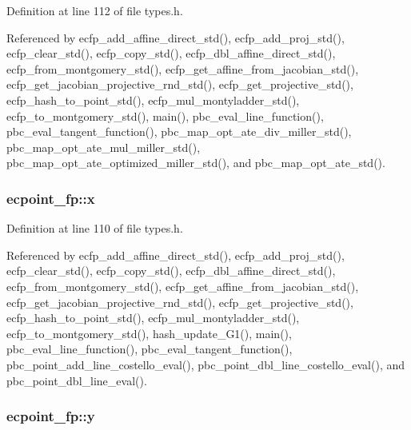 Definition at line 112 of file types.\-h.



Referenced by ecfp\-\_\-add\-\_\-affine\-\_\-direct\-\_\-std(), ecfp\-\_\-add\-\_\-proj\-\_\-std(), ecfp\-\_\-clear\-\_\-std(), ecfp\-\_\-copy\-\_\-std(), ecfp\-\_\-dbl\-\_\-affine\-\_\-direct\-\_\-std(), ecfp\-\_\-from\-\_\-montgomery\-\_\-std(), ecfp\-\_\-get\-\_\-affine\-\_\-from\-\_\-jacobian\-\_\-std(), ecfp\-\_\-get\-\_\-jacobian\-\_\-projective\-\_\-rnd\-\_\-std(), ecfp\-\_\-get\-\_\-projective\-\_\-std(), ecfp\-\_\-hash\-\_\-to\-\_\-point\-\_\-std(), ecfp\-\_\-mul\-\_\-montyladder\-\_\-std(), ecfp\-\_\-to\-\_\-montgomery\-\_\-std(), main(), pbc\-\_\-eval\-\_\-line\-\_\-function(), pbc\-\_\-eval\-\_\-tangent\-\_\-function(), pbc\-\_\-map\-\_\-opt\-\_\-ate\-\_\-div\-\_\-miller\-\_\-std(), pbc\-\_\-map\-\_\-opt\-\_\-ate\-\_\-mul\-\_\-miller\-\_\-std(), pbc\-\_\-map\-\_\-opt\-\_\-ate\-\_\-optimized\-\_\-miller\-\_\-std(), and pbc\-\_\-map\-\_\-opt\-\_\-ate\-\_\-std().

\hypertarget{structecpoint__fp_a5d560562bc26a70f40189ad902070f28}{
\subsubsection[{x}]{ ecpoint\-\_\-fp\-::x}}\label{structecpoint__fp_a5d560562bc26a70f40189ad902070f28}


Definition at line 110 of file types.\-h.



Referenced by ecfp\-\_\-add\-\_\-affine\-\_\-direct\-\_\-std(), ecfp\-\_\-add\-\_\-proj\-\_\-std(), ecfp\-\_\-clear\-\_\-std(), ecfp\-\_\-copy\-\_\-std(), ecfp\-\_\-dbl\-\_\-affine\-\_\-direct\-\_\-std(), ecfp\-\_\-from\-\_\-montgomery\-\_\-std(), ecfp\-\_\-get\-\_\-affine\-\_\-from\-\_\-jacobian\-\_\-std(), ecfp\-\_\-get\-\_\-jacobian\-\_\-projective\-\_\-rnd\-\_\-std(), ecfp\-\_\-get\-\_\-projective\-\_\-std(), ecfp\-\_\-hash\-\_\-to\-\_\-point\-\_\-std(), ecfp\-\_\-mul\-\_\-montyladder\-\_\-std(), ecfp\-\_\-to\-\_\-montgomery\-\_\-std(), hash\-\_\-update\-\_\-\-G1(), main(), pbc\-\_\-eval\-\_\-line\-\_\-function(), pbc\-\_\-eval\-\_\-tangent\-\_\-function(), pbc\-\_\-point\-\_\-add\-\_\-line\-\_\-costello\-\_\-eval(), pbc\-\_\-point\-\_\-dbl\-\_\-line\-\_\-costello\-\_\-eval(), and pbc\-\_\-point\-\_\-dbl\-\_\-line\-\_\-eval().

\hypertarget{structecpoint__fp_a099711871e8206f551c4f1bfb8fa2903}{
\subsubsection[{y}]{ ecpoint\-\_\-fp\-::y}}\label{structecpoint__fp_a099711871e8206f551c4f1bfb8fa2903}


